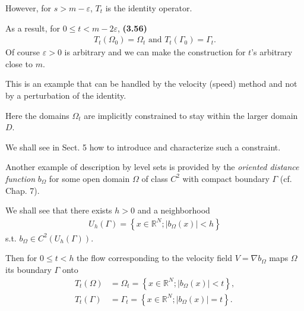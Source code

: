 \documentclass{book}
\numberwithin{equation}{section}
\begin{document}
\begin{enumerate}
\begin{enumerate}
        However, for $s > m - \varepsilon$, $T_t$ is the identity operator.
        
        As a result, for $0\le t < m - 2\varepsilon$, \textbf{(3.56)}
        \begin{align*}
            T_t\left(\Omega_0\right) = \Omega_t \mbox{ and } T_t\left(\Gamma_0\right) = \Gamma_t.
        \end{align*}
        Of course $\varepsilon > 0$ is arbitrary and we can make the construction for $t$'s arbitrary close to $m$.
        
        This is an example that can be handled by the velocity (speed) method and not by a perturbation of the identity.
        
        Here the domains $\Omega_t$ are implicitly constrained to stay within the larger domain $D$.
        
        We shall see in Sect. 5 how to introduce and characterize such a constraint.
        
        Another example of description by level sets is provided by the \textit{oriented distance function} $b_\Omega$ for some open domain $\Omega$ of class $C^2$ with compact boundary $\Gamma$ (cf. Chap. 7).
        
        We shall see that there exists $h > 0$ and a neighborhood
        \begin{align*}
            U_h(\Gamma) = \left\{x\in\mathbb{R}^N;\left|b_\Omega(x)\right| < h\right\}
        \end{align*}
        s.t. $b_\Omega\in C^2(U_h(\Gamma))$.
        
        Then for $0\le t < h$ the flow corresponding to the velocity field $V = \nabla b_\Omega$ maps $\Omega$ its boundary $\Gamma$ onto
        \begin{align*}
            T_t(\Omega) &= \Omega_t = \left\{x\in\mathbb{R}^N;\left|b_\Omega(x)\right| < t\right\},\\
            T_t(\Gamma) &= \Gamma_t = \left\{x\in\mathbb{R}^N;\left|b_\Omega(x)\right| = t\right\}.
        \end{align*}
    \end{enumerate}
\end{enumerate}
\end{document}
